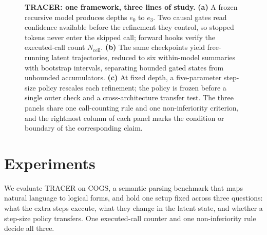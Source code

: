 \documentclass[11pt]{article}
\begin{document}
\begin{figure}[t]
{%
}
\caption{\textbf{TRACER: one framework, three lines of study.} \textbf{(a)} A frozen recursive model produces depths $e_0$ to $e_3$. Two causal gates read confidence available before the refinement they control, so stopped tokens never enter the skipped call; forward hooks verify the executed-call count $N_{\mathrm{cell}}$. \textbf{(b)} The same checkpoints yield free-running latent trajectories, reduced to six within-model summaries with bootstrap intervals, separating bounded gated states from unbounded accumulators. \textbf{(c)} At fixed depth, a five-parameter step-size policy rescales each refinement; the policy is frozen before a single outer check and a cross-architecture transfer test. The three panels share one call-counting rule and one non-inferiority criterion, and the rightmost column of each panel marks the condition or boundary of the corresponding claim.}
\label{fig:framework}
\end{figure}

\section{Experiments}
\label{sec:exp}

We evaluate TRACER on COGS, a semantic parsing benchmark that maps natural language to logical forms, and hold one setup fixed across three questions: what the extra steps execute, what they change in the latent state, and whether a step-size policy transfers. One executed-call counter and one non-inferiority rule decide all three.
\end{document}
